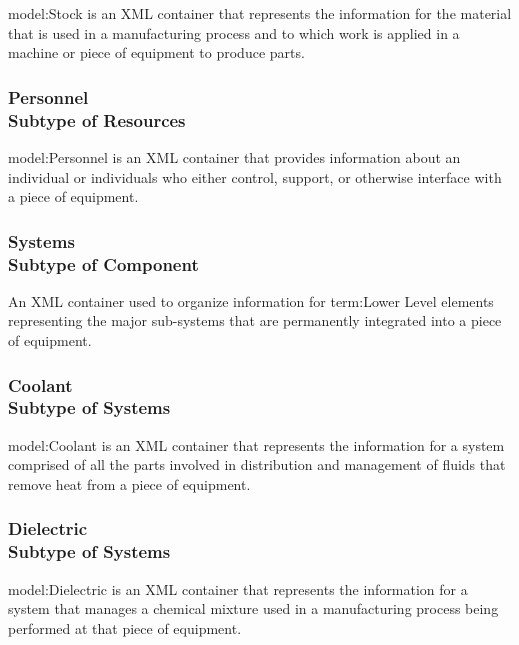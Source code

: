 \FloatBarrier

{model:Stock} is an XML container that represents the information for the material that is used in a manufacturing process and to which work is applied in a machine or piece of equipment to produce parts.

\FloatBarrier
\subsubsection[Personnel]{Personnel \\ {\small Subtype of Resources}}
  \label{type:Personnel}

\FloatBarrier

{model:Personnel} is an XML container that provides information about an individual or individuals who either control, support, or otherwise interface with a piece of equipment.


\FloatBarrier
\subsubsection[Systems]{Systems \\ {\small Subtype of Component}}
  \label{type:Systems}

\FloatBarrier

An XML container used to organize information for {term:Lower Level} elements representing the major sub-systems that are permanently integrated into a piece of equipment.

\FloatBarrier
\subsubsection[Coolant]{Coolant \\ {\small Subtype of Systems}}
  \label{type:Coolant}

\FloatBarrier

{model:Coolant} is an XML container that represents the information for a system comprised of all the parts involved in distribution and management of fluids that remove heat from a piece of equipment.

\FloatBarrier
\subsubsection[Dielectric]{Dielectric \\ {\small Subtype of Systems}}
  \label{type:Dielectric}

\FloatBarrier

{model:Dielectric} is an XML container that represents the information for a system that manages a chemical mixture used in a manufacturing process being performed at that piece of equipment.

